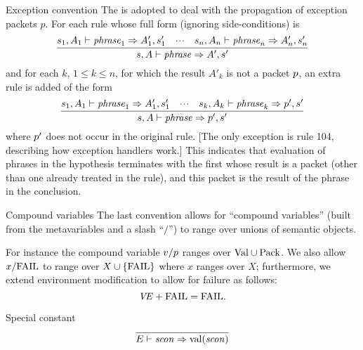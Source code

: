 \begin{convention}{Exception convention}\label{convention:dynamic-convention:exception}
The  is adopted to deal with the
propagation of exception packets $p$. For each rule whose full form
(ignoring side-conditions) is
\begin{equation*}
\infer{ \s,A\ts\phrase\ra A',\s'}
      { \s_{1},A_{1}\ts\phrase_{1}\ra A'_{1},\s'_{1}
        & \cdots
        & \s_{n},A_{n}\ts\phrase_{n}\ra A'_{n},\s'_{n} }
\end{equation*}
and for each $k$, $1\leq k\leq n$, for which the result $A'_{k}$ is not a
packet $p$, an extra rule is added of the form
\begin{equation*}
\infer{ \s,A\ts\phrase\ra \p',\s'}
      { \s_{1},A_{1}\ts\phrase_{1}\ra A'_{1},\s'_{1}
        & \cdots
        & \s_{k},A_{k}\ts\phrase_{k}\ra \p',\s' }
\end{equation*}
where $p'$ does not occur in the original rule. [The only exception is
  rule 104, describing how exception handlers work.]
This indicates that evaluation of phrases in the hypothesis terminates with the
first whose result is a packet (other than one already treated in the rule),
and this packet is the result of the phrase in the conclusion.
\end{convention}

\begin{convention}{Compound variables}
The last convention allows for ``compound variables'' (built from the
metavariables and a slash ``$/$'') to range over unions of semantic
objects.

For instance 
the compound variable $v/p$ ranges
over ${\rm Val}\cup{\rm Pack}$. 
We also allow $x/{\rm FAIL}$ to range over $X\cup\{{\rm FAIL}\}$ where $x$ 
ranges over $X$;
furthermore, we extend environment modification to allow for failure
as follows:
\begin{equation*}
\textit{V\kern-.05emE\/}+{\rm FAIL}={\rm FAIL}.
\end{equation*}
\end{convention}


\begin{inference-rule}{Special constant}
\begin{equation}\label{rule:dynamic-core:sconexp}
\vcenter{\infer{\E\ts\scon\ra\sconval(\scon)}
  {}}
\end{equation}
\end{inference-rule}

